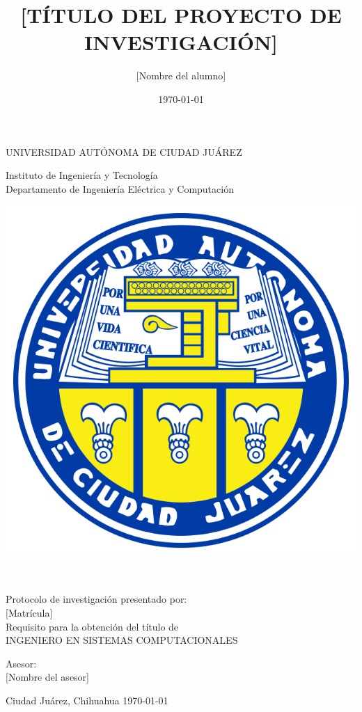 \documentclass[final,12pt]{article}
\title{[TÍTULO DEL PROYECTO DE INVESTIGACIÓN]} %
\author{[Nombre del alumno]} %
\date{\today}
\begin{document}
	\thispagestyle{empty}
\begin{center} \vfill
{\Large UNIVERSIDAD AUTÓNOMA DE CIUDAD JUÁREZ}\\
\vspace{6mm}
{\large Instituto de Ingeniería y Tecnología\\
\vspace{6mm}
Departamento de Ingeniería Eléctrica y Computación
\vspace{20mm}

\includegraphics [scale=0.7]{images/escudo-uacj} 
\vspace{10mm}






\thetitle\\
\vspace{15mm}


Protocolo de investigación presentado por:\\
\vspace{6mm}
\theauthor\hspace{10mm} [Matrícula]\\
\vspace{10mm}
Requisito para la obtención del título de\\
\vspace{6mm}
INGENIERO EN SISTEMAS COMPUTACIONALES\\
\vspace{10mm}

Asesor:\\
{[Nombre del asesor]}\\
} \vfill
	Ciudad Juárez, Chihuahua \hspace{70mm}\today

\end{center} 
\end{document}
